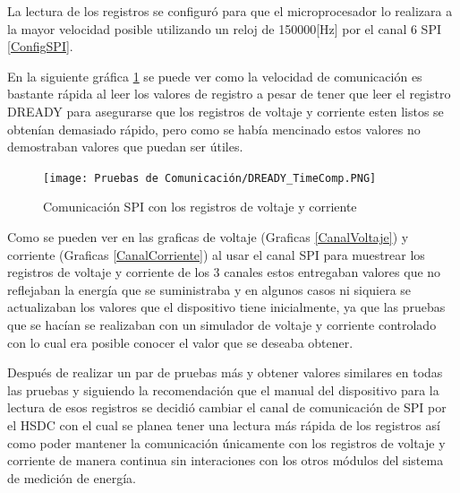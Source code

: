 \documentclass[letterpaper,12pt,oneside]{book}
\begin{document}
		La lectura de los registros se configuró para que el microprocesador lo realizara a la mayor velocidad posible utilizando un reloj de 150000[Hz] por el canal 6 SPI \ref{ConfigSPI}.

		En la siguiente gráfica \ref{ComSPI} se puede ver como la velocidad de comunicación es bastante rápida al leer los valores de registro a pesar de tener que leer el registro DREADY para asegurarse que los registros de voltaje y corriente esten listos se obtenían demasiado rápido, pero como se había mencinado estos valores no demostraban valores que puedan ser útiles.

		\begin{figure}[!htpb]
			\centering
			\texttt{[image: Pruebas de Comunicación/DREADY\_TimeComp.PNG]}
			\caption[Comunicación SPI con los registros de voltaje y corriente]{Comunicación SPI con los registros de voltaje y corriente}
			\label{ComSPI} 
		\end{figure}

		Como se pueden ver en las graficas de voltaje (Graficas \ref{CanalVoltaje}) y corriente (Graficas \ref{CanalCorriente}) al usar el canal SPI para muestrear los registros de voltaje y corriente de los 3 canales estos entregaban valores que no reflejaban la energía que se suministraba y en algunos casos ni siquiera se actualizaban los valores que el dispositivo tiene inicialmente, ya que las pruebas que se hacían se realizaban con un simulador de voltaje y corriente controlado con lo cual era posible conocer el valor que se deseaba obtener.

		Después de realizar un par de pruebas más y obtener valores similares en todas las pruebas y siguiendo la recomendación que el manual del dispositivo para la lectura de esos registros se decidió cambiar el canal de comunicación de SPI por el HSDC con el cual se planea tener una lectura más rápida de los registros así como poder mantener la comunicación únicamente con los registros de voltaje y corriente de manera continua sin interaciones con los otros módulos del sistema de medición de energía.
\end{document}
